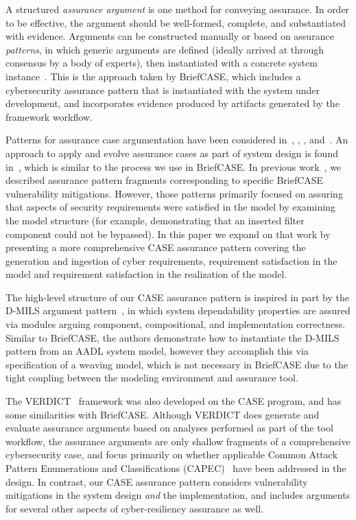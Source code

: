 A structured \textit{assurance argument} is one method for conveying assurance.
In order to be effective, the argument should be well-formed, complete, and substantiated with evidence.    
Arguments can be constructed manually or based on assurance \textit{patterns}, in which generic arguments are defined (ideally arrived at through consensus by a body of experts), then instantiated with a concrete system instance~\cite{Kelly97:patterns}.  This is the approach taken by BriefCASE, which includes a cybersecurity assurance pattern that is instantiated with the system under development, and incorporates evidence produced by artifacts generated by the framework workflow.

Patterns for assurance case argumentation have been considered in~\cite{Denney13:pattern}, \cite{Hawkins11:pattern}, \cite{Kelly97:patterns}, and~\cite{Sun11:pattern}. An approach to apply and evolve assurance cases as part of system design is found in~\cite{Graydon07:dev}, which is similar to the process we use in BriefCASE.
%
In previous work~\cite{resolute-destion}, we described assurance pattern fragments corresponding to specific BriefCASE vulnerability mitigations.  However, those patterns primarily focused on assuring that aspects of security requirements were satisfied in the model by examining the model structure (for example, demonstrating that an inserted filter component could not be bypassed).  
%
In this paper we expand on that work by presenting a more comprehensive CASE assurance pattern covering the generation and ingestion of cyber requirements, requirement satisfaction in the model and requirement satisfaction in the realization of the model.  

The high-level structure of our CASE assurance pattern is inspired in part by the D-MILS argument pattern~\cite{dmils}, in which system dependability properties are assured via modules arguing component, compositional, and implementation correctness.  Similar to BriefCASE, the authors demonstrate how to instantiate the D-MILS pattern from an AADL system model, however they accomplish this via specification of a weaving model, which is not necessary in BriefCASE due to the tight coupling between the modeling environment and assurance tool.

The VERDICT~\cite{verdict} framework was also developed on the CASE program, and has some similarities with BriefCASE.  Although VERDICT does generate and evaluate assurance arguments based on analyses performed as part of the tool workflow, the assurance arguments are only shallow fragments of a comprehensive cybersecurity case, and focus primarily on whether applicable Common Attack Pattern Enumerations and Classifications (CAPEC)~\cite{capec} have been addressed in the design.  In contrast, our CASE assurance pattern considers vulnerability mitigations in the system design \textit{and} the implementation, and includes arguments for several other aspects of cyber-resiliency assurance as well.

